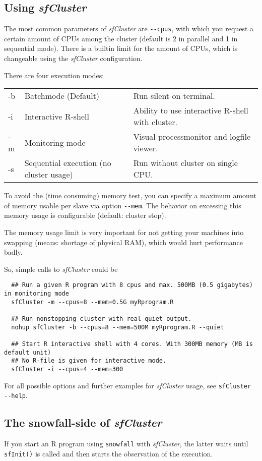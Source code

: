 \documentclass[10pt,oneside]{article}
\begin{document}
\subsection{Using \emph{sfCluster}}
The most common parameters of \emph{sfCluster} are \texttt{{-}{-}cpus}, with which you request a certain
amount of CPUs among the cluster (default is 2 in parallel and 1 in sequential mode).
There is a builtin limit for the amount of CPUs, which is changeable using the
\emph{sfCluster} configuration.

There are four execution modes:

\begin{tabular}{lll}
-b & Batchmode (Default) & Run silent on terminal.\\
-i & Interactive R-shell & Ability to use interactive R-shell with cluster.\\
-m & Monitoring mode & Visual processmonitor and logfile viewer.\\
-s & Sequential execution (no cluster usage) & Run without cluster on single CPU.\\
\end{tabular} 

To avoid the (time consuming) memory test, you can specify a maximum amount of
memory usable per slave via option \texttt{{-}{-}mem}. The behavior on excessing this memory
usage is configurable (default: cluster stop).

The memory usage limit is very important for not getting your machines into
swapping (means: shortage of physical RAM), which would hurt performance badly.

So, simple calls to \emph{sfCluster} could be

\begin{verbatim}
  ## Run a given R program with 8 cpus and max. 500MB (0.5 gigabytes) in monitoring mode
  sfCluster -m --cpus=8 --mem=0.5G myRprogram.R

  ## Run nonstopping cluster with real quiet output.
  nohup sfCluster -b --cpus=8 --mem=500M myRprogram.R --quiet

  ## Start R interactive shell with 4 cores. With 300MB memory (MB is default unit)
  ## No R-file is given for interactive mode.
  sfCluster -i --cpus=4 --mem=300
\end{verbatim}

For all possible options and further examples for \emph{sfCluster} usage,
see \texttt{sfCluster {-}{-}help}.

\subsection{The snowfall-side of \emph{sfCluster}}
If you start an R program using \texttt{snowfall} with \emph{sfCluster}, the latter waits
until \texttt{sfInit()} is called and then starts the observation of the execution.
\end{document}
